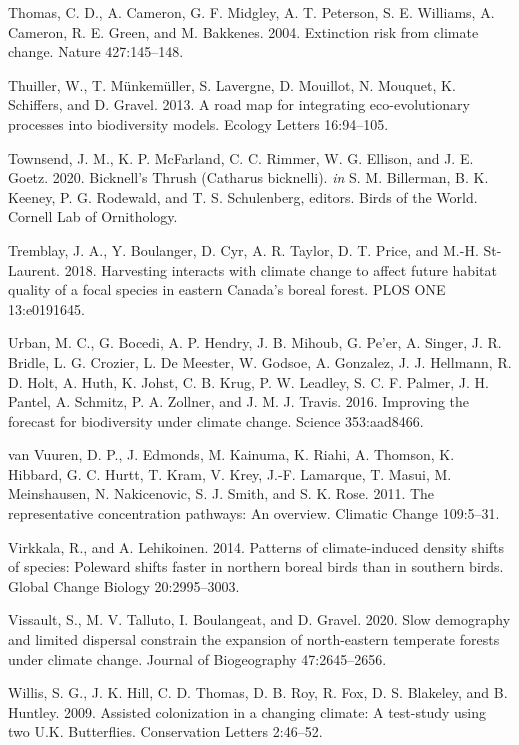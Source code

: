 \documentclass[12pt]{article}
\newlength{\cslhangindent}
\newenvironment{cslreferences}%
  {\setlength{\parindent}{0pt}%
  \everypar{\setlength{\hangindent}{\cslhangindent}}\ignorespaces}%
  {\par}
\begin{document}
\begin{cslreferences}
\leavevmode\hypertarget{ref-thomas_extinction_2004}{}%
Thomas, C. D., A. Cameron, G. F. Midgley, A. T. Peterson, S. E.
Williams, A. Cameron, R. E. Green, and M. Bakkenes. 2004. Extinction
risk from climate change. Nature 427:145--148.

\leavevmode\hypertarget{ref-thuiller_road_2013}{}%
Thuiller, W., T. Münkemüller, S. Lavergne, D. Mouillot, N. Mouquet, K.
Schiffers, and D. Gravel. 2013. A road map for integrating
eco-evolutionary processes into biodiversity models. Ecology Letters
16:94--105.

\leavevmode\hypertarget{ref-billerman_bicknells_2020}{}%
Townsend, J. M., K. P. McFarland, C. C. Rimmer, W. G. Ellison, and J. E.
Goetz. 2020. Bicknell's Thrush (Catharus bicknelli). \emph{in} S. M.
Billerman, B. K. Keeney, P. G. Rodewald, and T. S. Schulenberg, editors.
Birds of the World. Cornell Lab of Ornithology.

\leavevmode\hypertarget{ref-tremblay_harvesting_2018}{}%
Tremblay, J. A., Y. Boulanger, D. Cyr, A. R. Taylor, D. T. Price, and
M.-H. St-Laurent. 2018. Harvesting interacts with climate change to
affect future habitat quality of a focal species in eastern Canada's
boreal forest. PLOS ONE 13:e0191645.

\leavevmode\hypertarget{ref-urban_improving_2016}{}%
Urban, M. C., G. Bocedi, A. P. Hendry, J. B. Mihoub, G. Pe'er, A.
Singer, J. R. Bridle, L. G. Crozier, L. De Meester, W. Godsoe, A.
Gonzalez, J. J. Hellmann, R. D. Holt, A. Huth, K. Johst, C. B. Krug, P.
W. Leadley, S. C. F. Palmer, J. H. Pantel, A. Schmitz, P. A. Zollner,
and J. M. J. Travis. 2016. Improving the forecast for biodiversity under
climate change. Science 353:aad8466.

\leavevmode\hypertarget{ref-van_vuuren_representative_2011}{}%
van Vuuren, D. P., J. Edmonds, M. Kainuma, K. Riahi, A. Thomson, K.
Hibbard, G. C. Hurtt, T. Kram, V. Krey, J.-F. Lamarque, T. Masui, M.
Meinshausen, N. Nakicenovic, S. J. Smith, and S. K. Rose. 2011. The
representative concentration pathways: An overview. Climatic Change
109:5--31.

\leavevmode\hypertarget{ref-virkkala_patterns_2014}{}%
Virkkala, R., and A. Lehikoinen. 2014. Patterns of climate-induced
density shifts of species: Poleward shifts faster in northern boreal
birds than in southern birds. Global Change Biology 20:2995--3003.

\leavevmode\hypertarget{ref-vissault_slow_2020}{}%
Vissault, S., M. V. Talluto, I. Boulangeat, and D. Gravel. 2020. Slow
demography and limited dispersal constrain the expansion of
north-eastern temperate forests under climate change. Journal of
Biogeography 47:2645--2656.

\leavevmode\hypertarget{ref-willis_assisted_2009}{}%
Willis, S. G., J. K. Hill, C. D. Thomas, D. B. Roy, R. Fox, D. S.
Blakeley, and B. Huntley. 2009. Assisted colonization in a changing
climate: A test-study using two U.K. Butterflies. Conservation Letters
2:46--52.
\end{cslreferences}


\newpage
\end{document}
